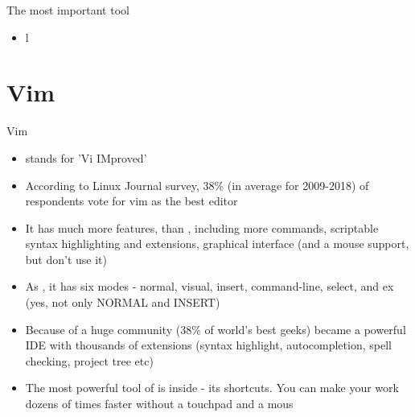 \documentclass[usenames,dvipsnames,10pt,aspectratio=169]{beamer}
\begin{document}
\begin{frame}{The most important tool}
    \begin{itemize}
        \item l
    \end{itemize}
\end{frame}


\section{Vim}


\begin{frame}{Vim}
    \begin{itemize}
        \item {} stands for 'Vi IMproved'
        \item According to Linux Journal survey, 38\% (in average for 2009-2018) of respondents vote for vim as the best editor
        \item It has much more features, than , including more commands, scriptable syntax highlighting and extensions, graphical interface (and a mouse support, but don't use it)
        \item As , it has six modes - normal, visual, insert, command-line, select, and ex (yes, not only NORMAL and INSERT)
        \item Because of a huge community (38\% of world's best geeks)  became a powerful IDE with thousands of extensions (syntax highlight, autocompletion, spell checking, project tree etc)
        \item The most powerful tool of  is inside - its shortcuts. You can make your work dozens of times faster without a touchpad and a mous
    \end{itemize}
\end{frame}
\end{document}
